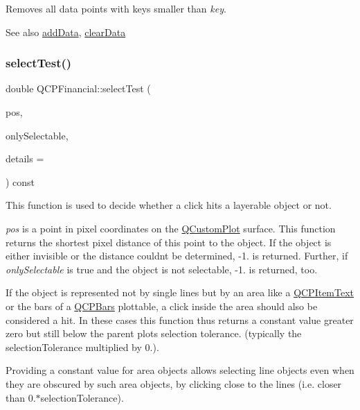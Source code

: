 Removes all data points with keys smaller than {\itshape key}.

\begin{DoxySeeAlso}{See also}
\mbox{\hyperlink{class_q_c_p_financial_a1a83396f97fcc68f2b7aa8d9782feffe}{add\+Data}}, \mbox{\hyperlink{class_q_c_p_financial_a11fd49928c33e55e27b7319c6927864a}{clear\+Data}} 
\end{DoxySeeAlso}
\mbox{\label{class_q_c_p_financial_a77bffad8f3fcbcccbef03ead1c538e3a}} 
\subsubsection{\texorpdfstring{select\+Test()}{selectTest()}}
{\footnotesize\ttfamily double Q\+C\+P\+Financial\+::select\+Test (\begin{DoxyParamCaption}\item[{const Q\+PointF \&}]{pos,  }\item[{bool}]{only\+Selectable,  }\item[{Q\+Variant $\ast$}]{details = {} }\end{DoxyParamCaption}) const\hspace{0.3cm}{\ttfamily [virtual]}}

This function is used to decide whether a click hits a layerable object or not.

{\itshape pos} is a point in pixel coordinates on the \mbox{\hyperlink{class_q_custom_plot}{Q\+Custom\+Plot}} surface. This function returns the shortest pixel distance of this point to the object. If the object is either invisible or the distance couldn\textquotesingle{}t be determined, -\/1. is returned. Further, if {\itshape only\+Selectable} is true and the object is not selectable, -\/1. is returned, too.

If the object is represented not by single lines but by an area like a \mbox{\hyperlink{class_q_c_p_item_text}{Q\+C\+P\+Item\+Text}} or the bars of a \mbox{\hyperlink{class_q_c_p_bars}{Q\+C\+P\+Bars}} plottable, a click inside the area should also be considered a hit. In these cases this function thus returns a constant value greater zero but still below the parent plot\textquotesingle{}s selection tolerance. (typically the selection\+Tolerance multiplied by 0.).

Providing a constant value for area objects allows selecting line objects even when they are obscured by such area objects, by clicking close to the lines (i.\+e. closer than 0.$\ast$selection\+Tolerance).

